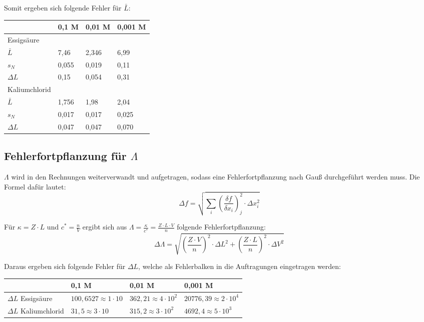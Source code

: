 \documentclass[12pt,a4paper,titlepage,headinclude,bibtotoc]{scrartcl}
\begin{document}
Somit ergeben sich folgende Fehler für $\bar{L}$:

\begin{table} [h]
\centering 
\begin{tabular}{|p{4cm}||p{2cm}|p{2cm}|p{2cm}|}
\hline
& 0,1 M & 0,01 M & 0,001 M \\
\hline
Essigsäure & & & \\
$\bar{L}$ &7,46 & 2,346 & 6,99\\
$s_N$ & 0,055 & 0,019 & 0,11 \\
$\Delta L$ & 0,15& 0,054& 0,31\\
\hline
Kaliumchlorid & & &\\
$\bar{L}$ & 1,756 & 1,98 & 2,04\\
$s_N$& 0,017 & 0,017 & 0,025\\
$\Delta L$ & 0,047& 0,047& 0,070\\
\hline
\end{tabular}
\end{table}

\subsection{Fehlerfortpflanzung für $\Lambda$}
$\Lambda$ wird in den Rechnungen weiterverwandt und aufgetragen, sodass eine Fehlerfortpflanzung nach Gauß durchgeführt werden muss. Die Formel dafür lautet:\\

\begin{equation}
\Delta f = \sqrt{\sum_i \left(\frac{\delta f}{\delta x_i}\right)^2_j \cdot \Delta x_i^2}
\end{equation}

Für $\kappa = Z \cdot L$ und $c^* =\frac{n}{V}$ ergibt sich aus $\Lambda = \frac{\kappa}{c^*}= \frac{Z \cdot L \cdot V}{n}$ folgende Fehlerfortpflanzung:\\

\begin{equation}
\Delta \Lambda = \sqrt{\left(\frac{Z \cdot V}{n}\right)^2 \cdot {\Delta L}^2 + \left(\frac{Z \cdot L}{n}\right)^2 \cdot \Delta V^2}
\end{equation}

Daraus ergeben sich folgende Fehler für $\Delta L$, welche als Fehlerbalken in die Auftragungen eingetragen werden:\\

\begin{table} [h]
\centering 
\begin{tabular}{|p{4cm}||p{4cm}|p{4cm}|p{4cm}|}
\hline
& 0,1 M & 0,01 M & 0,001 M \\
\hline
$\Delta L$ Essigsäure  & $100,6527 \approx 1\cdot 10$ & $362,21 \approx 4 \cdot 10^2 $& $20776,39 \approx 2 \cdot 10^4$ \\
\hline
$\Delta L$ Kaliumchlorid &$31,5 \approx 3 \cdot 10$ & $315,2 \approx 3 \cdot 10^2$ & $4692,4 \approx 5 \cdot 10^3$\\
\hline
\end{tabular}
\end{table}
\end{document}
